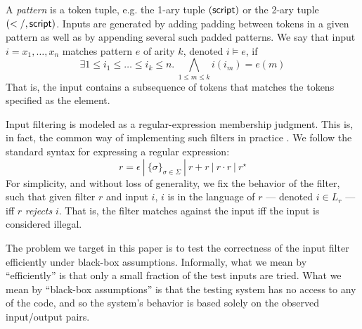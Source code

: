 A \emph{pattern} is a token tuple, e.g. the 1-ary tuple ${\sf (script)}$ or the 2-ary tuple $\sf{(</,script)}$. Inputs are generated by adding padding between tokens in a given pattern as well as by appending several such padded patterns. We say that input $i=x_1, \ldots ,x_n$ matches pattern $e$ of arity $k$, denoted $i \models e$, if
$$
\exists 1 \leq i_1 \leq \ldots \leq i_k \leq n.\ \bigwedge_{1 \leq m \leq k}
i(i_m) = e(m)  
$$
That is, the input contains a subsequence of tokens that matches the tokens specified as the element.

Input filtering is modeled as a regular-expression membership judgment. This is, in fact, the common way of implementing such filters in practice \cite{Regex}. We follow the standard syntax for expressing a regular expression:
$$
	r = \epsilon\ |\ \{ \sigma \}_{\sigma \in \Sigma}\ |\ r + r\ |\ r \cdot r\ |\ r^{\star}
$$
For simplicity, and without loss of generality, we fix the behavior of the filter, such that given filter $r$ and input $i$, $i$ is in the language of $r$ --- denoted $i \in L_r$ --- iff $r$ \emph{rejects} $i$. That is, the filter matches against the input iff the input is considered illegal.

The problem we target in this paper is to test the correctness of the input filter efficiently under black-box assumptions. Informally, what we mean by ``efficiently'' is that only a small fraction of the test inputs are tried. What we mean by ``black-box assumptions'' is that the testing system has no access to any of the code, and so the system's behavior is based solely on the observed input/output pairs.



